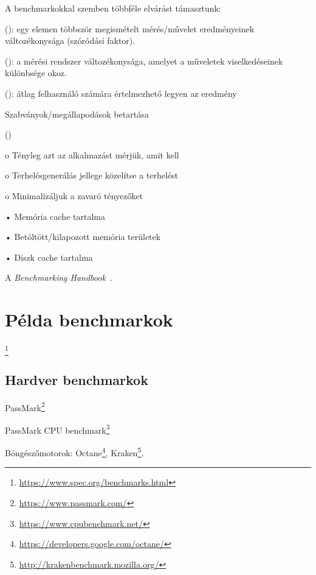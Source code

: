 A benchmarkokkal szemben többféle elvárást támasztunk:

\begin{definicio}
	 (): egy elemen többször megismételt mérés/művelet eredményeinek változékonysága (szóródási faktor).
\end{definicio}

\begin{definicio}
	 (): a mérési rendszer változékonysága, amelyet a műveletek viselkedéseinek különbsége okoz.
\end{definicio}

\begin{definicio}
	 (): átlag felhasználó számára értelmezhető legyen az eredmény
\end{definicio}

Szabványok/megállapodások betartása

 ()

o Tényleg azt az alkalmazást mérjük, amit kell

o Terhelésgenerálás jellege közelítse a  terhelést

o Minimalizáljuk a zavaró tényezőket

• Memória cache tartalma

• Betöltött/kilapozott memória területek

• Diszk cache tartalma

A \emph{Benchmarking Handbook}~\cite{DBLP:books/mk/Gray93}.


\section{Példa benchmarkok\kieg}

\footnote{\url{https://www.spec.org/benchmarks.html}}

\subsection{Hardver benchmarkok}

PassMark\footnote{\url{https://www.passmark.com/}}

PassMark CPU benchmark\footnote{\url{https://www.cpubenchmark.net/}}

Böngészőmotorok: Octane\footnote{\url{https://developers.google.com/octane/}},
Kraken\footnote{\url{http://krakenbenchmark.mozilla.org/}}.

